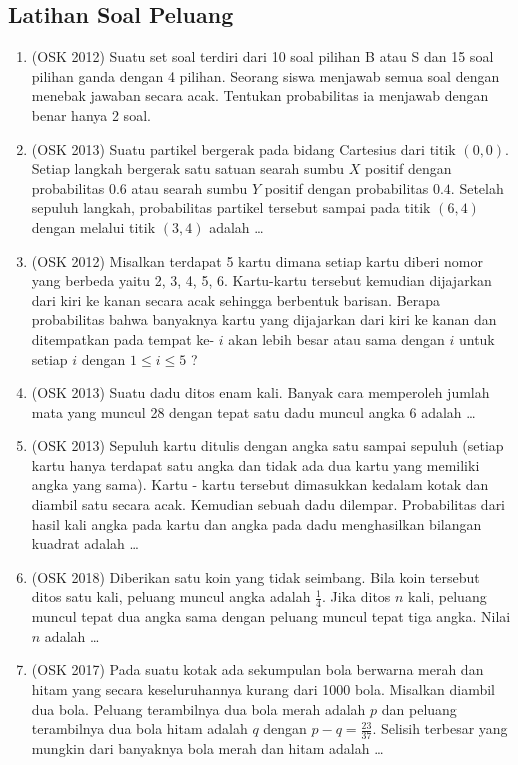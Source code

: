 \subsection{Latihan Soal Peluang}
\begin{enumerate}
        \item (OSK 2012) Suatu set soal terdiri dari 10 soal pilihan B atau S dan 15 soal pilihan ganda dengan 4 pilihan. Seorang siswa menjawab semua soal dengan menebak jawaban secara acak. Tentukan probabilitas ia menjawab dengan benar hanya 2 soal.

        \item (OSK 2013) Suatu partikel bergerak pada bidang Cartesius dari titik $(0, 0)$. Setiap langkah bergerak satu satuan searah sumbu $X$ positif dengan probabilitas $0.6$ atau searah sumbu $Y$ positif dengan probabilitas $0.4$. Setelah sepuluh langkah, probabilitas partikel tersebut sampai pada titik $(6,4)$ dengan melalui titik $(3,4)$ adalah \ldots
        
        \item (OSK 2012) Misalkan terdapat 5 kartu dimana setiap kartu diberi nomor yang berbeda yaitu 2, 3, 4, 5, 6. Kartu-kartu tersebut kemudian dijajarkan dari kiri ke kanan secara acak sehingga berbentuk barisan. Berapa probabilitas bahwa banyaknya kartu yang dijajarkan dari kiri ke kanan dan ditempatkan pada tempat ke- $i$ akan lebih besar atau sama dengan $i$ untuk setiap $i$ dengan $1 \le i \le 5$ ?
        
        \item (OSK 2013) Suatu dadu ditos enam kali. Banyak cara memperoleh jumlah mata yang muncul 28 dengan tepat satu dadu muncul angka 6 adalah \dots
        
        \item (OSK 2013) Sepuluh kartu ditulis dengan angka satu sampai sepuluh (setiap kartu hanya terdapat satu angka dan tidak ada dua kartu yang memiliki angka yang sama). Kartu - kartu tersebut dimasukkan kedalam kotak dan diambil satu secara acak. Kemudian sebuah dadu dilempar. Probabilitas dari hasil kali angka pada kartu dan angka pada dadu menghasilkan bilangan kuadrat adalah \dots
        
        \item (OSK 2018) Diberikan satu koin yang tidak seimbang. Bila koin tersebut ditos satu kali, peluang muncul angka adalah $\frac{1}{4}$. Jika ditos $n$ kali, peluang muncul tepat dua angka sama dengan peluang muncul tepat tiga angka. Nilai $n$ adalah \dots
        
        \item (OSK 2017) Pada suatu kotak ada sekumpulan bola berwarna merah dan hitam yang secara keseluruhannya kurang dari 1000 bola. Misalkan diambil dua bola. Peluang terambilnya dua bola merah adalah $p$ dan peluang terambilnya dua bola hitam adalah $q$ dengan $p-q =\frac{23}{37}$. Selisih terbesar yang mungkin dari banyaknya bola merah dan hitam adalah \dots
\end{enumerate}